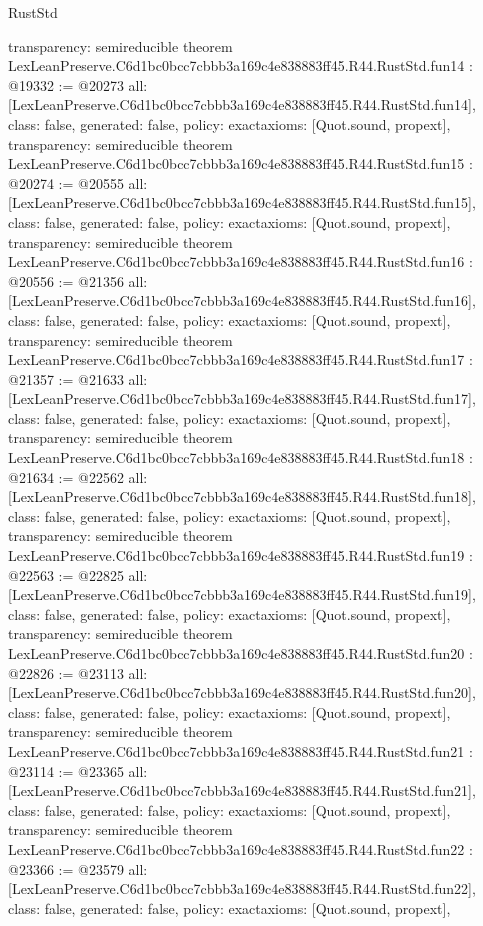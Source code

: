 \begin{lexlean}{RustStd}
\begin{coremodule}
{  transparency: semireducible
}
theorem LexLeanPreserve.C6d1bc0bcc7cbbb3a169c4e838883ff45.R44.RustStd.fun14 : @19332 := @20273 {
  all: [LexLeanPreserve.C6d1bc0bcc7cbbb3a169c4e838883ff45.R44.RustStd.fun14],
  class: false,
  generated: false,
  policy: exact{axioms: [Quot.sound, propext]},
  transparency: semireducible
}
theorem LexLeanPreserve.C6d1bc0bcc7cbbb3a169c4e838883ff45.R44.RustStd.fun15 : @20274 := @20555 {
  all: [LexLeanPreserve.C6d1bc0bcc7cbbb3a169c4e838883ff45.R44.RustStd.fun15],
  class: false,
  generated: false,
  policy: exact{axioms: [Quot.sound, propext]},
  transparency: semireducible
}
theorem LexLeanPreserve.C6d1bc0bcc7cbbb3a169c4e838883ff45.R44.RustStd.fun16 : @20556 := @21356 {
  all: [LexLeanPreserve.C6d1bc0bcc7cbbb3a169c4e838883ff45.R44.RustStd.fun16],
  class: false,
  generated: false,
  policy: exact{axioms: [Quot.sound, propext]},
  transparency: semireducible
}
theorem LexLeanPreserve.C6d1bc0bcc7cbbb3a169c4e838883ff45.R44.RustStd.fun17 : @21357 := @21633 {
  all: [LexLeanPreserve.C6d1bc0bcc7cbbb3a169c4e838883ff45.R44.RustStd.fun17],
  class: false,
  generated: false,
  policy: exact{axioms: [Quot.sound, propext]},
  transparency: semireducible
}
theorem LexLeanPreserve.C6d1bc0bcc7cbbb3a169c4e838883ff45.R44.RustStd.fun18 : @21634 := @22562 {
  all: [LexLeanPreserve.C6d1bc0bcc7cbbb3a169c4e838883ff45.R44.RustStd.fun18],
  class: false,
  generated: false,
  policy: exact{axioms: [Quot.sound, propext]},
  transparency: semireducible
}
theorem LexLeanPreserve.C6d1bc0bcc7cbbb3a169c4e838883ff45.R44.RustStd.fun19 : @22563 := @22825 {
  all: [LexLeanPreserve.C6d1bc0bcc7cbbb3a169c4e838883ff45.R44.RustStd.fun19],
  class: false,
  generated: false,
  policy: exact{axioms: [Quot.sound, propext]},
  transparency: semireducible
}
theorem LexLeanPreserve.C6d1bc0bcc7cbbb3a169c4e838883ff45.R44.RustStd.fun20 : @22826 := @23113 {
  all: [LexLeanPreserve.C6d1bc0bcc7cbbb3a169c4e838883ff45.R44.RustStd.fun20],
  class: false,
  generated: false,
  policy: exact{axioms: [Quot.sound, propext]},
  transparency: semireducible
}
theorem LexLeanPreserve.C6d1bc0bcc7cbbb3a169c4e838883ff45.R44.RustStd.fun21 : @23114 := @23365 {
  all: [LexLeanPreserve.C6d1bc0bcc7cbbb3a169c4e838883ff45.R44.RustStd.fun21],
  class: false,
  generated: false,
  policy: exact{axioms: [Quot.sound, propext]},
  transparency: semireducible
}
theorem LexLeanPreserve.C6d1bc0bcc7cbbb3a169c4e838883ff45.R44.RustStd.fun22 : @23366 := @23579 {
  all: [LexLeanPreserve.C6d1bc0bcc7cbbb3a169c4e838883ff45.R44.RustStd.fun22],
  class: false,
  generated: false,
  policy: exact{axioms: [Quot.sound, propext]},
}
\end{coremodule}
\end{lexlean}
